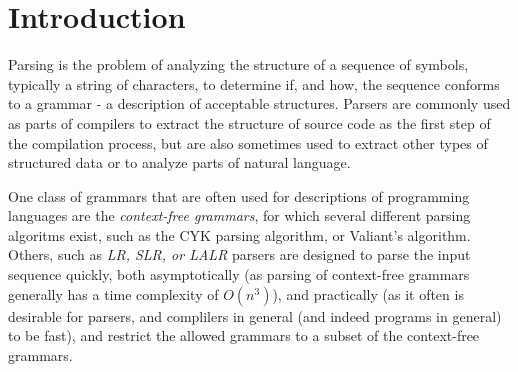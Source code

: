 \chapter{Introduction}


%

	Parsing is the problem of analyzing the structure of a sequence of
	symbols, typically a string of characters, to determine if, and how, the
	sequence conforms to a grammar - a description of acceptable structures.
	Parsers are commonly used as parts of compilers to extract the structure of
	source code as the first step of the compilation process, but are also
	sometimes used to extract other types of structured data or to analyze
	parts of natural language.

	One class of grammars that are often used for descriptions of programming
	languages are the \emph{context-free grammars}, for which several different
	parsing algoritms exist, such as the CYK parsing algorithm, or Valiant's
	algorithm. Others, such as \emph{LR, SLR, or LALR} parsers are designed to
	parse the input sequence quickly, both asymptotically (as parsing of
	context-free grammars generally has a time complexity of $O(n^3)$), and
	practically (as it often is desirable for parsers, and complilers in
	general (and indeed programs in general) to be fast), and restrict the
	allowed grammars to a subset of the context-free grammars.

